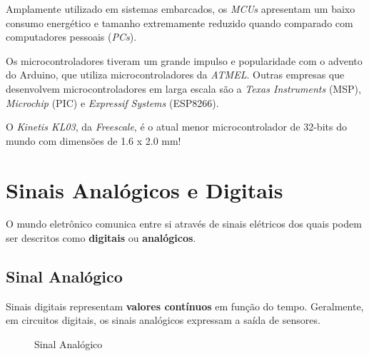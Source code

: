 \documentclass[
	11pt,				%
	openright,			%
	twoside,			%
	a5paper,			%
	english,			%
	french,				%
	spanish,			%
	brazil,				%
	sumario=tradicional
]{abntex2}
\begin{document}
Amplamente utilizado em sistemas embarcados, os \textit{MCUs} apresentam um baixo consumo energético e tamanho extremamente reduzido quando comparado com computadores pessoais (\textit{PCs}).

Os microcontroladores tiveram um grande impulso e popularidade com o advento do Arduino, que utiliza microcontroladores da \textit{ATMEL}. Outras empresas que desenvolvem microcontroladores em larga escala são a  \textit{Texas Instruments} (MSP), \textit{Microchip} (PIC) e \textit{Expressif Systems} (ESP8266).

\vspace{5pt}

           \begin{tcolorbox}[colbacktitle=blue!70!white!50,
title={\vspace{-13pt}\texttt{[image: interrogacao.png]} \hspace{2pt} \textsf{\textbf{Você sabia?}\vspace{4pt}}},coltitle=black, colback=white,arc=4mm, outer arc=3.5mm]
\raggedright

O \textit{Kinetis KL03}, da \textit{Freescale}, é o atual menor microcontrolador de 32-bits do mundo com dimensões de 1.6 x 2.0 mm! 
\end{tcolorbox}

\section{Sinais Analógicos e Digitais}
O mundo eletrônico comunica entre si através de sinais elétricos dos quais podem ser descritos como \textsf{\textbf{digitais}} ou \textsf{\textbf{analógicos}}.

\subsection{Sinal Analógico}
   Sinais digitais representam \textbf{\textsf{valores contínuos}} em função do tempo. Geralmente, em circuitos digitais, os sinais analógicos expressam a saída de sensores.
   
   \begin{figure}[ht]
   \centering
   \label{Sinal-Analogico}
    \caption{Sinal Analógico}   
   \end{figure}
    
\end{document}
